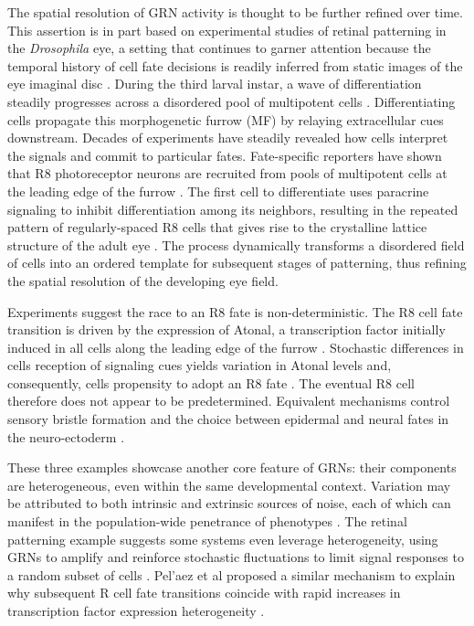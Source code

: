 The spatial resolution of GRN activity is thought to be further refined over time. This assertion is in part based on experimental studies of retinal patterning in the \textit{Drosophila} eye, a setting that continues to garner attention because the temporal history of cell fate decisions is readily inferred from static images of the eye imaginal disc \cite{Pelaez2015a}. During the third larval instar, a wave of differentiation steadily progresses across a disordered pool of multipotent cells \cite{Ready1976,Tomlinson1987}. Differentiating cells propagate this morphogenetic furrow (MF) by relaying extracellular cues downstream. Decades of experiments have steadily revealed how cells interpret the signals and commit to particular fates. Fate-specific reporters have shown that R8 photoreceptor neurons are recruited from pools of multipotent cells at the leading edge of the furrow \cite{Jarman1994,}. The first cell to differentiate uses paracrine signaling to inhibit differentiation among its neighbors, resulting in the repeated pattern of regularly-spaced R8 cells that gives rise to the crystalline lattice structure of the adult eye \cite{Frankfort2002}. The process dynamically transforms a disordered field of cells into an ordered template for subsequent stages of patterning, thus refining the spatial resolution of the developing eye field.

Experiments suggest the race to an R8 fate is non-deterministic. The R8 cell fate transition is driven by the expression of Atonal, a transcription factor initially induced in all cells along the leading edge of the furrow \cite{Jarman1994,Baker1997,Hsiung2002}. Stochastic differences in cells reception of signaling cues yields variation in Atonal levels and, consequently, cells propensity to adopt an R8 fate \cite{Baker1990,Gavish2016}. The eventual R8 cell therefore does not appear to be predetermined. Equivalent mechanisms control sensory bristle formation and the choice between epidermal and neural fates in the neuro-ectoderm \cite{Ghysen1993,Simpson1997}.

These three examples showcase another core feature of GRNs: their components are heterogeneous, even within the same developmental context. Variation may be attributed to both intrinsic and extrinsic sources of noise, each of which can manifest in the population-wide penetrance of phenotypes \cite{Raj2010,Paulsen2011,Burga2011,ColmanLerner2005}. The retinal patterning example suggests some systems even leverage heterogeneity, using GRNs to amplify and reinforce stochastic fluctuations to limit signal responses to a random subset of cells \cite{Baker1990,Ghysen1993,Simpson1997}. Pel'{a}ez et al proposed a similar mechanism to explain why subsequent R cell fate transitions coincide with rapid increases in transcription factor expression heterogeneity \cite{Pelaez2015a}.

